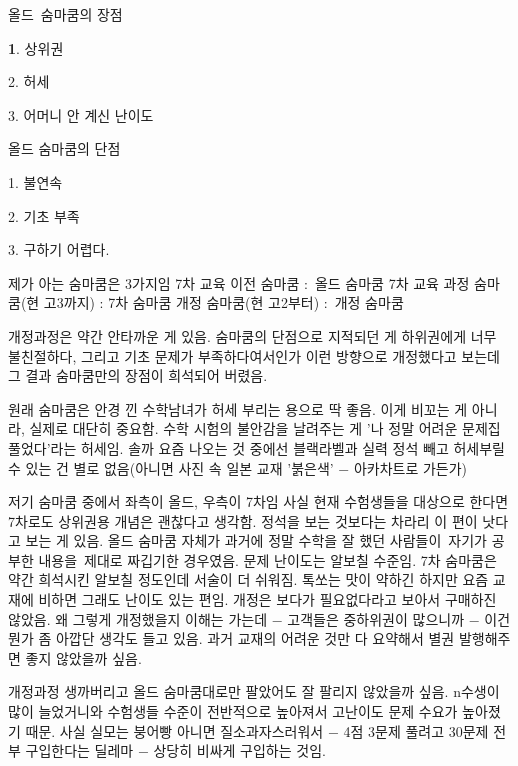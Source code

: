 올드 숨마쿰의 장점
\item \textbf{1}. 상위권
\item 2. 허세
\item 3. 어머니 안 계신 난이도
\vspace{5mm}

올드 숨마쿰의 단점
\item 1. 불연속
\item 2. 기초 부족
\item 3. 구하기 어렵다.
\vspace{5mm}

제가 아는 숨마쿰은 3가지임
7차 교육 이전 숨마쿰 : 올드 숨마쿰
7차 교육 과정 숨마쿰(현 고3까지) : 7차 숨마쿰
개정 숨마쿰(현 고2부터) : 개정 숨마쿰
\vspace{5mm}

개정과정은 약간 안타까운 게 있음.
숨마쿰의 단점으로 지적되던 게 하위권에게 너무 불친절하다, 그리고 기초 문제가 부족하다여서인가
이런 방향으로 개정했다고 보는데 그 결과 숨마쿰만의 장점이 희석되어 버렸음.
\vspace{5mm}

원래 숨마쿰은 안경 낀 수학남녀가 허세 부리는 용으로 딱 좋음.
이게 비꼬는 게 아니라, 실제로 대단히 중요함. 수학 시험의 불안감을 날려주는 게 '나 정말 어려운 문제집 풀었다'라는 허세임.
솔까 요즘 나오는 것 중에선 블랙라벨과 실력 정석 빼고 허세부릴 수 있는 건 별로 없음(아니면 사진 속 일본 교재 '붉은색' $-$ 아카차트로 가든가)
\vspace{5mm}

저기 숨마쿰 중에서 좌측이 올드, 우측이 7차임
사실 현재 수험생들을 대상으로 한다면 7차로도 상위권용 개념은 괜찮다고 생각함.
정석을 보는 것보다는 차라리 이 편이 낫다고 보는 게 있음.
올드 숨마쿰 자체가 과거에 정말 수학을 잘 했던 사람들이 자기가 공부한 내용을 제대로 짜깁기한 경우였음.
문제 난이도는 알보칠 수준임.
7차 숨마쿰은 약간 희석시킨 알보칠 정도인데 서술이 더 쉬워짐. 톡쏘는 맛이 약하긴 하지만 요즘 교재에 비하면 그래도 난이도 있는 편임.
개정은 보다가 필요없다라고 보아서 구매하진 않았음. 왜 그렇게 개정했을지 이해는 가는데 $-$ 고객들은 중하위권이 많으니까 $-$
이건 뭔가 좀 아깝단 생각도 들고 있음. 과거 교재의 어려운 것만 다 요약해서 별권 발행해주면 좋지 않았을까 싶음.
\vspace{5mm}

개정과정 생까버리고 올드 숨마쿰대로만 팔았어도 잘 팔리지 않았을까 싶음.
n수생이 많이 늘었거니와 수험생들 수준이 전반적으로 높아져서 고난이도 문제 수요가 높아졌기 때문.
사실 실모는 붕어빵 아니면 질소과자스러워서 $-$ 4점 3문제 풀려고 30문제 전부 구입한다는 딜레마 $-$ 상당히 비싸게 구입하는 것임.
\vspace{5mm}

